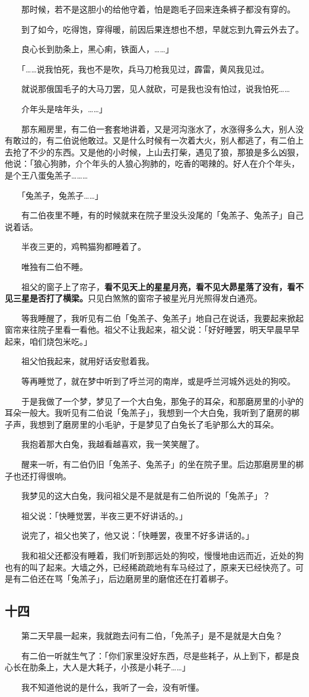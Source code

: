 \documentclass[UTF8]{ctexart}
\begin{document}
　　那时候，若不是这胆小的给他守着，怕是跑毛子回来连条裤子都没有穿的。

　　到了如今，吃得饱，穿得暖，前因后果连想也不想，早就忘到九霄云外去了。

　　良心长到肋条上，黑心痢，铁面人，……」

　　「……说我怕死，我也不是吹，兵马刀枪我见过，霹雷，黄风我见过。

　　就说那俄国毛子的大马刀罢，见人就砍，可是我也没有怕过，说我怕死……

　　介年头是啥年头，……」

　　那东厢房里，有二伯一套套地讲着，又是河沟涨水了，水涨得多么大，别人没有敢过的，有二伯说他敢过。又是什么时候有一次着大火，别人都逃了，有二伯上去抢了不少的东西。又是他的小时候，上山去打柴，遇见了狼，那狼是多么凶狠，他说：「狼心狗肺，介个年头的人狼心狗肺的，吃香的喝辣的。好人在介个年头，是个王八蛋兔羔子………

　　「兔羔子，兔羔子……」

　　有二伯夜里不睡，有的时候就来在院子里没头没尾的「兔羔子、兔羔子」自己说着话。

　　半夜三更的，鸡鸭猫狗都睡着了。

　　唯独有二伯不睡。

　　祖父的窗子上了帘子，\textbf{看不见天上的星星月亮，看不见大昴星落了没有，看不见三星是否打了横梁。}只见白煞煞的窗帘子被星光月光照得发白通亮。

　　等我睡醒了，我听见有二伯「兔羔子、兔羔子」地自己在说话，我要起来掀起窗帘来往院子里看一看他。祖父不让我起来，祖父说：「好好睡罢，明天早晨早早起来，咱们烧包米吃。」

　　祖父怕我起来，就用好话安慰着我。

　　等再睡觉了，就在梦中听到了呼兰河的南岸，或是呼兰河城外远处的狗咬。

　　于是我做了一个梦，梦见了一个大白兔，那兔子的耳朵，和那磨房里的小驴的耳朵一般大。我听见有二伯说「兔羔子」，我想到一个大白兔，我听到了磨房的梆子声，我想到了磨房里的小毛驴，于是梦见了白兔长了毛驴那么大的耳朵。

　　我抱着那大白兔，我越看越喜欢，我一笑笑醒了。

　　醒来一听，有二伯仍旧「兔羔子、兔羔子」的坐在院子里。后边那磨房里的梆子也还打得很响。

　　我梦见的这大白兔，我问祖父是不是就是有二伯所说的「兔羔子」？

　　祖父说：「快睡觉罢，半夜三更不好讲话的。」

　　说完了，祖父也笑了，他又说：「快睡罢，夜里不好多讲话的。」

　　我和祖父还都没有睡着，我们听到那远处的狗咬，慢慢地由远而近，近处的狗也有的叫了起来。大墙之外，已经稀疏疏地有车马经过了，原来天已经快亮了。可是有二伯还在骂「兔羔子」，后边磨房里的磨倌还在打着梆子。

\subsection{十四}

　　第二天早晨一起来，我就跑去问有二伯，「免羔子」是不是就是大白兔？

　　有二伯一听就生气了：「你们家里没好东西，尽是些耗子，从上到下，都是良心长在肋条上，大人是大耗子，小孩是小耗子……」

　　我不知道他说的是什么，我听了一会，没有听懂。
\end{document}
